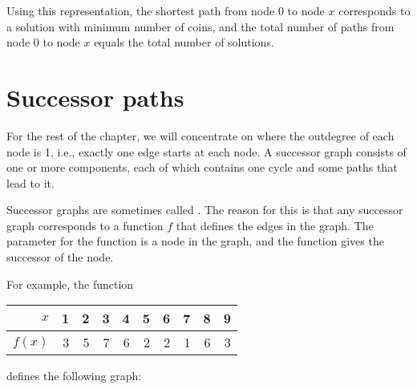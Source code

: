Using this representation,
the shortest path from node 0 to node $x$
corresponds to a solution with minimum number of coins,
and the total number of paths from node 0 to node $x$
equals the total number of solutions.

\section{Successor paths}


For the rest of the chapter,
we will concentrate on 
where the outdegree of each node is 1, i.e.,
exactly one edge starts at each node.
A successor graph consists of one or more
components, each of which contains
one cycle and some paths that lead to it.

Successor graphs are sometimes called
.
The reason for this is that any successor graph
corresponds to a function $f$ that defines
the edges in the graph.
The parameter for the function is a node in the graph,
and the function gives the successor of the node.

\begin{samepage}
For example, the function
\begin{center}
\begin{tabular}{r|rrrrrrrrr}
$x$ & 1 & 2 & 3 & 4 & 5 & 6 & 7 & 8 & 9 \\
\hline
$f(x)$ & 3 & 5 & 7 & 6 & 2 & 2 & 1 & 6 & 3 \\
\end{tabular}
\end{center}
\end{samepage}
defines the following graph:
\begin{center}
\end{center}

